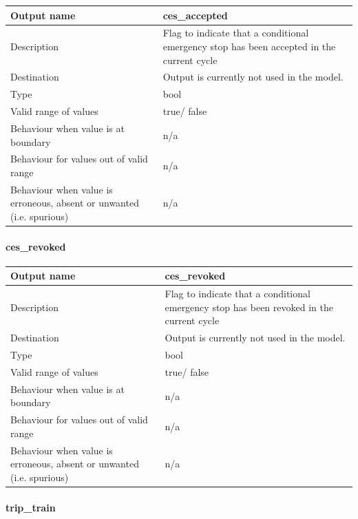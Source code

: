 \begin{longtable}{p{}p{}}
\toprule
Output name				& ces\_accepted \\
\midrule
Description				& Flag to indicate that a conditional emergency stop has been accepted in the current cycle \\
\midrule
Destination				& Output is currently not used in the model.  \\ 
\midrule
Type					& bool\\
\midrule
Valid range of values	& true/ false \\
\midrule
Behaviour when value is at boundary	& n/a  \\
\midrule
Behaviour for values out of valid range	& n/a  \\
\midrule
Behaviour when value is erroneous, absent or unwanted (i.e. spurious) & n/a  \\
\bottomrule
\end{longtable}

\paragraph{ces\_revoked}

\begin{longtable}{p{}p{}}
\toprule
Output name				& ces\_revoked \\
\midrule
Description				& Flag to indicate that a conditional emergency stop has been revoked in the current cycle \\
\midrule
Destination				& Output is currently not used in the model.  \\ 
\midrule
Type					& bool\\
\midrule
Valid range of values	& true/ false \\
\midrule
Behaviour when value is at boundary	& n/a  \\
\midrule
Behaviour for values out of valid range	& n/a  \\
\midrule
Behaviour when value is erroneous, absent or unwanted (i.e. spurious) & n/a  \\
\bottomrule
\end{longtable}

\paragraph{trip\_train}

